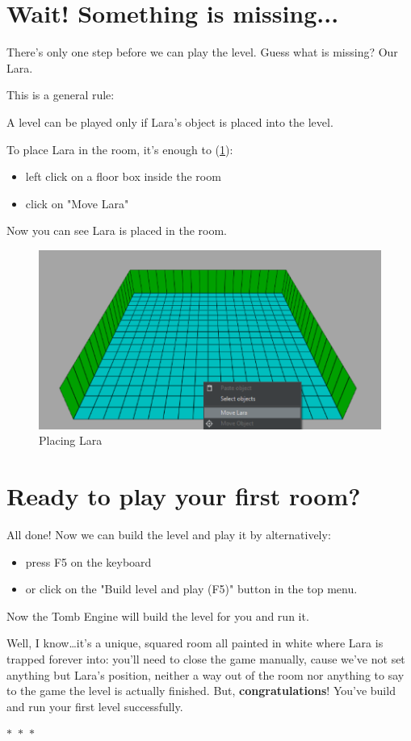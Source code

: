 \section{Wait! Something is missing...}

There's only one step before we can play the level. Guess what is missing? Our Lara.
\par This is a general rule:
\begin{remark}
A level can be played only if Lara's object is placed into the level.
\end{remark}
To place Lara in the room, it's enough to (\ref{fig:temovelara}):
\begin{itemize}
    \item left click on a floor box inside the room
    \item click on "Move Lara"
\end{itemize}
Now you can see Lara is placed in the room.

\begin{figure}
    \centering
     \includegraphics[width=1\textwidth]{screenshots/1001.png}
     \caption{Placing Lara}
     \label{fig:temovelara} 
\end{figure}

\section{Ready to play your first room?}
All done! Now we can build the level and play it by alternatively:
\begin{itemize}
    \item press F5 on the keyboard
    \item or click on the "Build level and play (F5)" button in the top menu.
\end{itemize}
Now the Tomb Engine will build the level for you and run it.
\par Well, I know\dots it's a unique, squared room all painted in white where Lara is trapped forever into: you'll need to close the game manually, cause we've not set anything but Lara's position, neither a way out of the room nor anything to say to the game the level is actually finished. But, \textbf{congratulations}! You've build and run your first level successfully.
\begin{center}
  $\ast$~$\ast$~$\ast$
\end{center}

